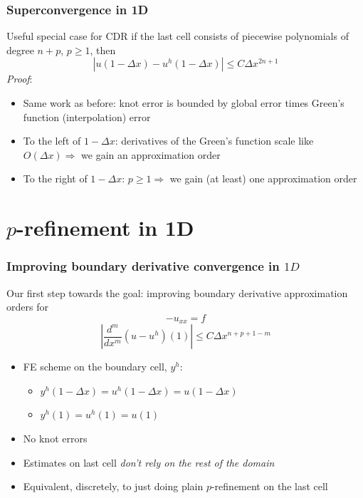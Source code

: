 \documentclass[8pt]{beamer}
\begin{document}
\begin{frame}
    \frametitle{Superconvergence in 1D}
    Useful special case for CDR if the last cell consists of piecewise
    polynomials of degree \(n + p\), \(p \geq 1\), then
    \begin{equation*}
        |u(1 - \Delta x) - u^h(1 - \Delta x)| \leq C \Delta x^{2 n + 1}
    \end{equation*}
    \pause
    \emph{Proof}:
    \begin{itemize}
        \item Same work as before: knot error is bounded by global error times
              Green's function (interpolation) error
        \item To the left of \(1 - \Delta x\): derivatives of the Green's
              function scale like \(O(\Delta x) \Rightarrow\) we gain an
              approximation order
        \item To the right of \(1 - \Delta x\): \(p \geq 1 \Rightarrow\) we gain
              (at least) one approximation order
    \end{itemize}
\end{frame}

\section{\(p\)-refinement in 1D}
\begin{frame}
    \frametitle{Improving boundary derivative convergence in \(1D\)}
    Our first step towards the goal: improving boundary derivative approximation
    orders for
    \begin{equation*}
        -u_{xx} = f
    \end{equation*}
    \pause
    \begin{equation*}
        \left|\dfrac{d^m}{dx^m}(u - u^h)(1)\right|
        \leq C \Delta x^{n + p + 1 - m}
    \end{equation*}
    \pause
    \begin{itemize}
        \item FE scheme on the boundary cell, \(y^h\):
              \begin{itemize}
                  \item \(y^h(1 - \Delta x) = u^h(1 - \Delta x) = u(1 - \Delta x)\)
                  \item \(y^h(1) = u^h(1) = u(1)\)
              \end{itemize}
              \pause
        \item No knot errors
        \item Estimates on last cell \emph{don't rely on the rest of the
              domain}
        \item Equivalent, discretely, to just doing plain \(p\)-refinement on
              the last cell
    \end{itemize}
\end{frame}
\end{document}
